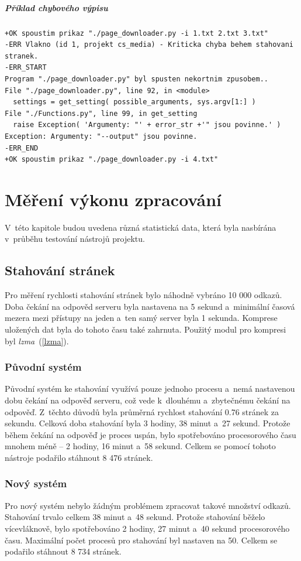 \paragraph{Příklad chybového výpisu}
\begin{lstlisting}
+OK spoustim prikaz "./page_downloader.py -i 1.txt 2.txt 3.txt"
-ERR Vlakno (id 1, projekt cs_media) - Kriticka chyba behem stahovani stranek.
-ERR_START
Program "./page_downloader.py" byl spusten nekortnim zpusobem..
File "./page_downloader.py", line 92, in <module>
  settings = get_setting( possible_arguments, sys.argv[1:] )
File "./Functions.py", line 99, in get_setting
  raise Exception( 'Argumenty: "' + error_str +'" jsou povinne.' )
Exception: Argumenty: "--output" jsou povinne.
-ERR_END
+OK spoustim prikaz "./page_downloader.py -i 4.txt"
\end{lstlisting}

\chapter{Měření výkonu zpracování}
V~této kapitole budou uvedena různá statistická data, která byla nasbírána v~průběhu
testování nástrojů projektu.

\section{Stahování stránek}
Pro měření rychlosti stahování stránek bylo náhodně vybráno 10 000 odkazů. Doba čekání
na odpověd serveru byla nastavena na 5 sekund a~minimální časová mezera mezi přístupy
na jeden a~ten samý server byla 1 sekunda. Komprese uložených dat byla do tohoto
času také zahrnuta. Použitý modul pro kompresi byl \textit{lzma}~(\ref{lzma}).

\subsection{Původní systém}
Původní systém ke stahování využívá pouze jednoho procesu a~nemá nastavenou dobu
čekání na odpověď serveru, což vede k~dlouhému a~zbytečnému čekání na odpověď.
Z~těchto důvodů byla průměrná rychlost stahování 0.76 stránek za sekundu. Celková doba
stahování byla 3 hodiny, 38 minut a~27 sekund. Protože během čekání na odpověď je
proces uspán, bylo spotřebováno procesorového času mnohem méně -- 2 hodiny, 16 minut a~58 sekund. Celkem se pomocí tohoto nástroje podařilo stáhnout 8 476 stránek.

\subsection{Nový systém}
Pro nový systém nebylo žádným problémem zpracovat takové množství odkazů. Stahování
trvalo celkem 38 minut a~48 sekund. Protože stahování běželo vícevláknově, bylo
spotřebováno 2 hodiny, 27 minut a~40 sekund procesorového času. Maximální počet
procesů pro stahování byl nastaven na 50. Celkem se podařilo stáhnout 8 734 stránek.

